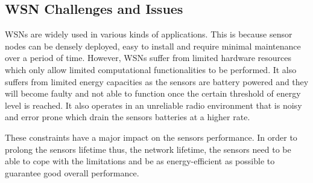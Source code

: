 \subsection{WSN Challenges and Issues}
WSNs are widely used in various kinds of applications. This is because sensor nodes can be densely deployed, easy to install and require minimal maintenance over a period of time. However, WSNs suffer from limited hardware resources which only allow limited computational functionalities to be performed. It also suffers from limited energy capacities as the sensors are battery powered and they will become faulty and not able to function once the certain threshold of energy level is reached. It also operates in an unreliable radio environment that is noisy and error prone which drain the sensors batteries at a higher rate.

These constraints have a major impact on the sensors performance. In order to prolong the sensors lifetime thus, the network lifetime, the sensors need to be able to cope with the limitations and be as energy-efficient as possible to guarantee good overall performance.



